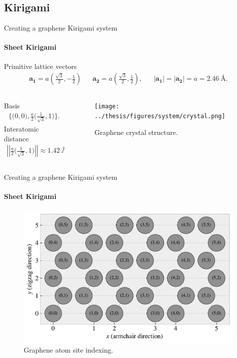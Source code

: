 \documentclass[
	10pt, %
]{beamer}
\renewcommand{\vec}[1]{\mathbf{#1}} %
\begin{document}
\subsection{Kirigami}
\begin{frame}{Creating a graphene Kirigami system}
	\framesubtitle{Sheet Kirigami}

	Primitive lattice vectors
	\begin{align*}
		&\vec{a_1} = a \left(\frac{\sqrt{3}}{2}, -\frac{1}{2}\right)&  &\vec{a_2} = a \left(\frac{\sqrt{3}}{2}, \frac{1}{2}\right),& &|\vec{a_1}| = |\vec{a_2}| = a = \SI{2.46}{\text{Å}}.& 
	\end{align*}
	
	\begin{columns} 
		\begin{column}{.4\textwidth}
			Basis
			\begin{align*}
				\Big\{\Big(0,0\Big), \frac{a}{2}\Big(\frac{1}{\sqrt{3}}, 1 \Big) \Big\}.
			  \end{align*}
			Interatomic distance
			\begin{align*}
				\left|\left|\frac{a}{2}\Big(\frac{1}{\sqrt{3}}, 1 \Big)\right|\right| \approx \SI{1.42}{\text{Å}}.
			\end{align*}
		\end{column}
		\begin{column}{.6\textwidth}
			\begin{figure}[H]
				\centering
				\texttt{[image: ../thesis/figures/system/crystal.png]}
				\caption{Graphene crystal structure.}
			\end{figure}
		\end{column}%
	\end{columns}
\end{frame}
%
%
\begin{frame}{Creating a graphene Kirigami system}
	\framesubtitle{Sheet Kirigami}
	\begin{figure}[H]
		\centering
		\includegraphics[width=0.7\linewidth]{../thesis/figures/system/atom_indexing.pdf}
		\caption{Graphene atom site indexing.}
	\end{figure}	
\end{frame}
\end{document}
